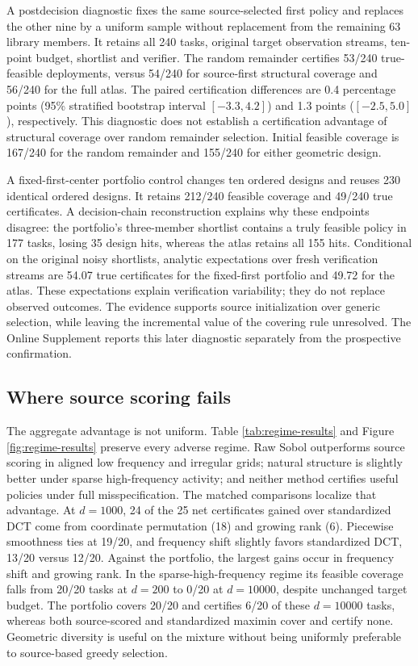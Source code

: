 A postdecision diagnostic fixes the same source-selected first policy and
replaces the other nine by a uniform sample without replacement from the
remaining 63 library members.  It retains all 240 tasks, original target
observation streams, ten-point budget, shortlist and verifier.  The random
remainder certifies 53/240 true-feasible deployments, versus 54/240 for
source-first structural coverage and 56/240 for the full atlas.
The paired certification differences are 0.4 percentage points
(95\% stratified bootstrap interval $[-3.3,4.2]$) and 1.3 points
($[-2.5,5.0]$), respectively.  This diagnostic does not establish a
certification advantage of structural coverage over random remainder
selection.  Initial feasible coverage is 167/240 for the random remainder
and 155/240 for either geometric design.

A fixed-first-center portfolio control changes ten ordered designs and
reuses 230 identical ordered designs.  It retains 212/240 feasible coverage
and 49/240 true certificates.  A decision-chain reconstruction explains why
these endpoints disagree: the portfolio's three-member shortlist contains a
truly feasible policy in 177 tasks, losing 35 design hits, whereas the atlas
retains all 155 hits.  Conditional on the original noisy shortlists, analytic
expectations over fresh verification streams are 54.07 true certificates for
the fixed-first portfolio and 49.72 for the atlas.  These expectations explain
verification variability; they do not replace observed outcomes.
The evidence supports source initialization over generic selection, while
leaving the incremental value of the covering rule unresolved.  The Online
Supplement reports this later diagnostic separately from the prospective
confirmation.

\subsection{Where source scoring fails}

The aggregate advantage is not uniform.  Table \ref{tab:regime-results} and
Figure \ref{fig:regime-results} preserve every adverse regime.  Raw Sobol
outperforms source scoring in aligned low frequency and irregular grids;
natural structure is slightly better under sparse high-frequency activity;
and neither method certifies useful policies under full misspecification.
The matched comparisons localize that advantage.  At $d=1000$, 24 of the
25 net certificates gained over standardized DCT come from coordinate
permutation (18) and growing rank (6).  Piecewise smoothness ties at 19/20,
and frequency shift slightly favors standardized DCT, 13/20 versus 12/20.
Against the portfolio, the largest gains occur in frequency shift and growing
rank.  In the sparse-high-frequency regime
its feasible coverage falls from 20/20 tasks at $d=200$ to 0/20 at $d=10000$,
despite unchanged target budget.  The portfolio covers 20/20 and certifies
6/20 of these $d=10000$ tasks, whereas both source-scored and standardized
maximin cover and certify none.  Geometric diversity is useful on the mixture
without being uniformly preferable to source-based greedy selection.


